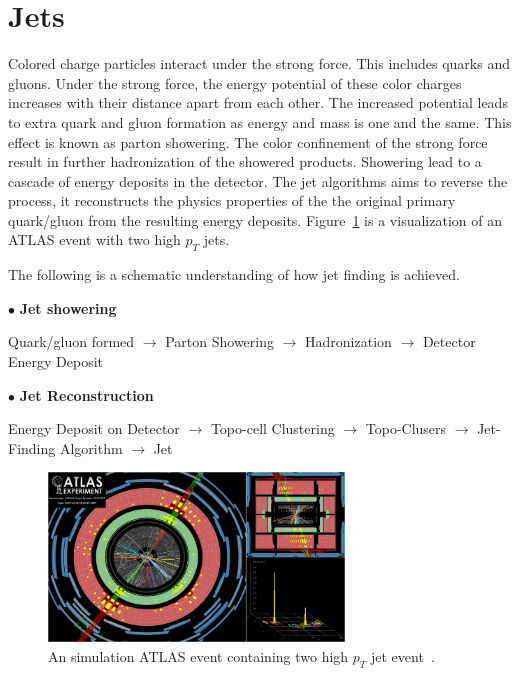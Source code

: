 \section{Jets}
\label{sec:Jet}
Colored charge particles interact under the strong force. This includes quarks and gluons. Under the strong force, the energy potential of these color charges increases with their distance apart from each other. The increased potential leads to extra quark and gluon formation as energy and mass is one and the same. This effect is known as parton showering. The color confinement of the strong force result in further hadronization of the showered products.
Showering lead to a cascade of energy deposits in the detector. The jet algorithms aims to reverse the process, it reconstructs the physics properties of the the original primary quark/gluon from the resulting energy deposits. Figure~\ref{fig:jetEvent} is a visualization of an ATLAS event with two high $p_{T}$ jets.

The following is a schematic understanding of how jet finding is achieved. 

$\bullet$ \textbf{Jet showering}

Quark/gluon formed $\rightarrow$  Parton Showering $\rightarrow$ Hadronization $\rightarrow$ Detector Energy Deposit

$\bullet$ \textbf{Jet Reconstruction}

Energy Deposit on Detector  $\rightarrow$  Topo-cell Clustering $\rightarrow$  Topo-Clusers $\rightarrow$  Jet-Finding Algorithm $\rightarrow$ Jet


\begin{figure}[!htb]
    \begin{center}
        \includegraphics[width=0.7\textwidth]{figures/common_ana/JetEvent}
        \caption{        
            An simulation ATLAS event containing two high $p_{T}$ jet event~\cite{jetEvent}.
        }
        \label{fig:jetEvent}
    \end{center}
\end{figure}

